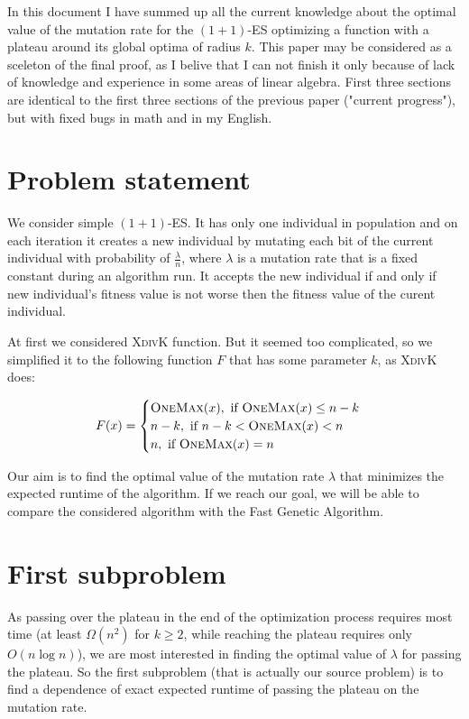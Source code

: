 \documentclass{article}
\newcommand{\OM}{\textsc{OneMax}\xspace}
\newcommand{\XdK}{\textsc{XdivK}\xspace}
\begin{document}
In this document I have summed up all the current knowledge about the optimal value of the mutation rate for the $(1 + 1)$-ES optimizing a function with a plateau around its global optima of radius $k$. This paper may be considered as a sceleton of the final proof, as I belive that I can not finish it only because of lack of knowledge and experience in some areas of linear algebra. First three sections are identical to the first three sections of the previous paper ("current progress"), but with fixed bugs in math and in my English.

\section{Problem statement}

We consider simple $(1 + 1)$-ES. It has only one individual in population and on each iteration it creates a new individual by mutating each bit of the current individual with probability of $\frac{\lambda}{n}$, where $\lambda$ is a mutation rate that is a fixed constant during an algorithm run. It accepts the new individual if and only if new individual's fitness value is not worse then the fitness value of the curent individual.

At first we considered \XdK function. But it seemed too complicated, so we simplified it to the following function $F$ that has some parameter $k$, as \XdK does:

\begin{align*}
  F(x) =
  \begin{cases}
    \OM(x), \text{ if } \OM(x) \le n - k \\
    n - k, \text{ if } n - k < \OM(x) < n \\
    n, \text{ if } \OM(x) = n \\
  \end{cases}
\end{align*}

Our aim is to find the optimal value of the mutation rate $\lambda$ that minimizes the expected runtime of the algorithm. If we reach our goal, we will be able to compare the considered algorithm with the Fast Genetic Algorithm.

\section{First subproblem}
As passing over the plateau in the end of the optimization process requires most time (at least $\Omega(n^2)$ for $k \ge 2$, while reaching the plateau requires only $O(n \log n)$), we are most interested in finding the optimal value of $\lambda$ for passing the plateau. So the first subproblem (that is actually our source problem) is to find a dependence of exact expected runtime of passing the plateau on the mutation rate.
\end{document}
